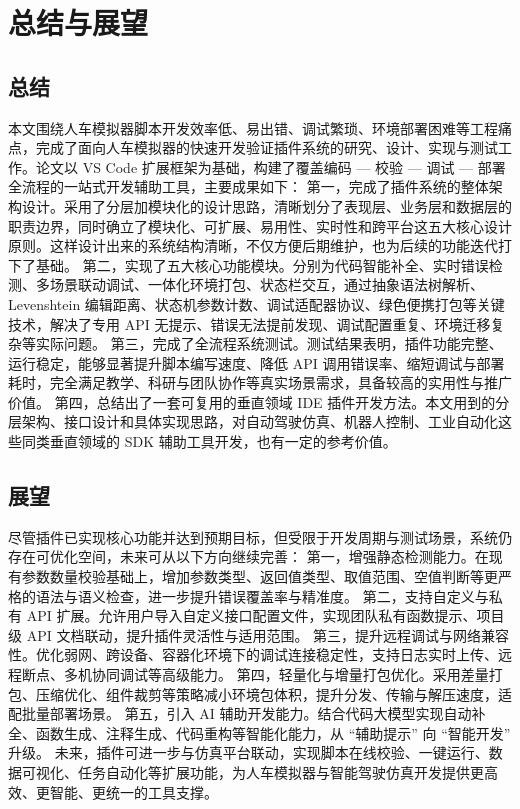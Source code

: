 \chapter{总结与展望}

\section{总结}

  本文围绕人车模拟器脚本开发效率低、易出错、调试繁琐、环境部署困难等工程痛点，完成了面向人车模拟器的快速开发验证插件系统的研究、设计、实现与测试工作。论文以 VS Code 扩展框架为基础，构建了覆盖编码 — 校验 — 调试 — 部署全流程的一站式开发辅助工具，主要成果如下：
  第一，完成了插件系统的整体架构设计。采用了分层加模块化的设计思路，清晰划分了表现层、业务层和数据层的职责边界，同时确立了模块化、可扩展、易用性、实时性和跨平台这五大核心设计原则。这样设计出来的系统结构清晰，不仅方便后期维护，也为后续的功能迭代打下了基础。
  第二，实现了五大核心功能模块。分别为代码智能补全、实时错误检测、多场景联动调试、一体化环境打包、状态栏交互，通过抽象语法树解析、Levenshtein 编辑距离、状态机参数计数、调试适配器协议、绿色便携打包等关键技术，解决了专用 API 无提示、错误无法提前发现、调试配置重复、环境迁移复杂等实际问题。
  第三，完成了全流程系统测试。测试结果表明，插件功能完整、运行稳定，能够显著提升脚本编写速度、降低 API 调用错误率、缩短调试与部署耗时，完全满足教学、科研与团队协作等真实场景需求，具备较高的实用性与推广价值。
  第四，总结出了一套可复用的垂直领域 IDE 插件开发方法。本文用到的分层架构、接口设计和具体实现思路，对自动驾驶仿真、机器人控制、工业自动化这些同类垂直领域的 SDK 辅助工具开发，也有一定的参考价值。

\section{展望}

  尽管插件已实现核心功能并达到预期目标，但受限于开发周期与测试场景，系统仍存在可优化空间，未来可从以下方向继续完善：
  第一，增强静态检测能力。在现有参数数量校验基础上，增加参数类型、返回值类型、取值范围、空值判断等更严格的语法与语义检查，进一步提升错误覆盖率与精准度。
  第二，支持自定义与私有 API 扩展。允许用户导入自定义接口配置文件，实现团队私有函数提示、项目级 API 文档联动，提升插件灵活性与适用范围。
  第三，提升远程调试与网络兼容性。优化弱网、跨设备、容器化环境下的调试连接稳定性，支持日志实时上传、远程断点、多机协同调试等高级能力。
  第四，轻量化与增量打包优化。采用差量打包、压缩优化、组件裁剪等策略减小环境包体积，提升分发、传输与解压速度，适配批量部署场景。
  第五，引入 AI 辅助开发能力。结合代码大模型实现自动补全、函数生成、注释生成、代码重构等智能化能力，从 “辅助提示” 向 “智能开发” 升级。
  未来，插件可进一步与仿真平台联动，实现脚本在线校验、一键运行、数据可视化、任务自动化等扩展功能，为人车模拟器与智能驾驶仿真开发提供更高效、更智能、更统一的工具支撑。

